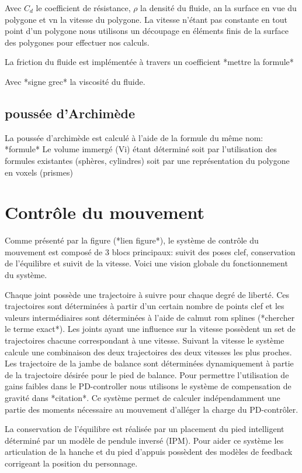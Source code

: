 \documentclass{llncs}
\begin{document}
Avec \(C_d\) le coefficient de résistance, \(\rho\) la densité du fluide, an la surface en vue du polygone et vn la vitesse du polygone. La vitesse n'étant pas constante en tout point d'un polygone nous utilisons un découpage en éléments finis de la surface des polygones pour effectuer nos calculs.

La friction du fluide est implémentée à travers un coefficient 
*mettre la formule*

Avec *signe grec* la viscosité du fluide.
%
\subsection{poussée d'Archimède}
%
La poussée d'archimède est calculé à l'aide de la formule du même nom:
*formule*
Le volume immergé (Vi) étant déterminé soit par l'utilisation des formules existantes (sphères, cylindres) soit par une représentation du polygone en voxels (prismes)
%
\section{Contrôle du mouvement}
Comme présenté par la figure (*lien figure*), le système de contrôle du mouvement est composé de 3 blocs principaux: suivit des poses clef, conservation de l'équilibre et suivit de la vitesse. Voici une vision globale du fonctionnement du système.

Chaque joint possède une trajectoire à suivre pour chaque degré de liberté. Ces trajectoires sont déterminées à partir d'un certain nombre de points clef et les valeurs intermédiaires sont déterminées à l'aide de calmut rom splines (*chercher le terme exact*). Les joints ayant une influence sur la vitesse possèdent un set de trajectoires chacune correspondant à une vitesse. Suivant la vitesse le système calcule une combinaison des deux trajectoires des deux vitesses les plus proches. Les trajectoire de la jambe de balance sont déterminées dynamiquement à partie de la trajectoire désirée pour le pied de balance.
Pour permettre l'utilisation de gains faibles dans le PD-controller nous utilisons le système de compensation de gravité dans *citation*. Ce système permet de calculer indépendamment une partie des moments nécessaire au mouvement d'alléger la charge du PD-contrôler.

La conservation de l'équilibre est réalisée par un placement du pied intelligent déterminé par un modèle de pendule inversé (IPM). Pour aider ce système les articulation de la hanche et du pied d'appuis possèdent des modèles de feedback corrigeant la position du personnage.
\end{document}
